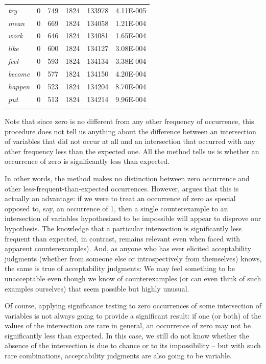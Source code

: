 \begin{table}[!htbp]
{\begin{tabular}[t]{l *{4}{S[table-format=5]} r}
\textit{try} & 0 & 749 & 1824 & 133978 & 4.11E-005 \\
\textit{mean} & 0 & 669 & 1824 & 134058 & 1.21E-004 \\
\textit{work} & 0 & 646 & 1824 & 134081 & 1.65E-004 \\
\textit{like} & 0 & 600 & 1824 & 134127 & 3.08E-004 \\
\textit{feel} & 0 & 593 & 1824 & 134134 & 3.38E-004 \\
\textit{become} & 0 & 577 & 1824 & 134150 & 4.20E-004 \\
\textit{happen} & 0 & 523 & 1824 & 134204 & 8.70E-004 \\
\textit{put} & 0 & 513 & 1824 & 134214 & 9.96E-004 \\
\lspbottomrule
\end{tabular}}
\end{table}

Note that since zero is no different from any other frequency of occurrence, this procedure does not tell us anything about the difference between an intersection of variables that did not occur at all and an intersection that occurred with any other frequency less than the expected one. All the method tells us is whether an occurrence of zero is significantly less than expected.

In other words, the method makes no distinction between zero occurrence and other less-frequent-than-expected occurrences. However, \citet[70f]{stefanowitsch_negative_2006} argues that this is actually an advantage: if we were to treat an occurrence of zero as special opposed to, say, an occurrence of 1, then a single counterexample to an intersection of variables hypothesized to be impossible will appear to disprove our hypothesis. The knowledge that a particular intersection is significantly less frequent than expected, in contrast, remains relevant even when faced with apparent counterexamples). And, as anyone who has ever elicited acceptability judgments (whether from someone else or introspectively from themselves) knows, the same is true of acceptability judgments: We may feel something to be unacceptable even though we know of counterexamples (or can even think of such examples ourselves) that seem possible but highly unusual.

Of course, applying significance testing to zero occurrences of some intersection of variables is not always going to provide a significant result: if one (or both) of the values of the intersection are rare in general, an occurrence of zero may not be significantly less than expected. In this case, we still do not know whether the absence of the intersection is due to chance or to its impossibility -- but with such rare combinations, acceptability judgments are also going to be variable. 


